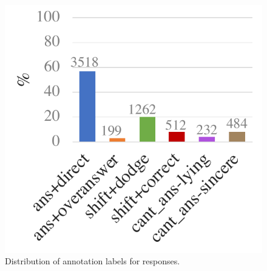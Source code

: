 \begin{figure}
\centering
\includegraphics[scale=.47]{plots/subj_response_dist.pdf}
\vspace{-1.0em}
\caption{Distribution of annotation labels for responses.}
\label{fig:subj_response_dist}
\end{figure}



